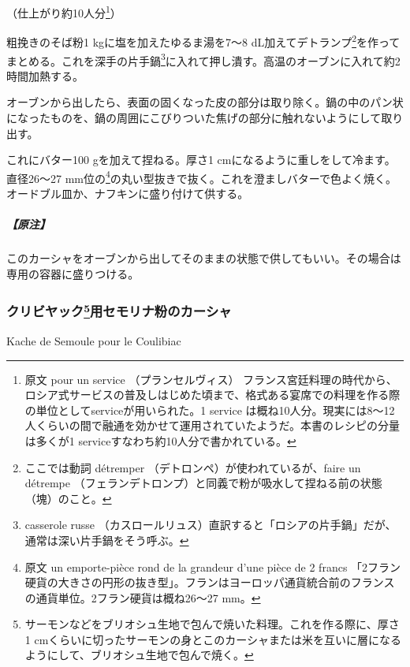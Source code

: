 \begin{recette}
（仕上がり約10人分\footnote{原文 pour un service （プランセルヴィス）
  フランス宮廷料理の時代から、ロシア式サービスの普及しはじめた頃まで、格式ある宴席での料理を作る際の単位としてserviceが用いられた。1
  service
  は概ね10人分。現実には8〜12人くらいの間で融通を効かせて運用されていたようだ。本書のレシピの分量は多くが1
  serviceすなわち約10人分で書かれている。}）

粗挽きのそば粉1 kgに塩を加えたゆるま湯を7〜8
dL加えてデトランプ\footnote{ここでは動詞 détremper
  （デトロンペ）が使われているが、faire un détrempe
  （フェランデトロンプ）と同義で粉が吸水して捏ねる前の状態（塊）のこと。}を作ってまとめる。これを深手の片手鍋\footnote{casserole
  russe
  （カスロールリュス）直訳すると「ロシアの片手鍋」だが、通常は深い片手鍋をそう呼ぶ。}に入れて押し潰す。高温のオーブンに入れて約2時間加熱する。

オーブンから出したら、表面の固くなった皮の部分は取り除く。鍋の中のパン状になったものを、鍋の周囲にこびりついた焦げの部分に触れないようにして取り出す。

これにバター100 gを加えて捏ねる。厚さ1
cmになるように重しをして冷ます。直径26〜27 mm位の\footnote{原文 un
  emporte-pièce rond de la grandeur d'une pièce de 2 francs
  「2フラン硬貨の大きさの円形の抜き型」。フランはヨーロッパ通貨統合前のフランスの通貨単位。2フラン硬貨は概ね26〜27
  mm。}の丸い型抜きで抜く。これを澄ましバターで色よく焼く。オードブル皿か、ナフキンに盛り付けて供する。

\hypertarget{nota-kache-de-sarrazin-pour-potage}{%
\subparagraph{【原注】}\label{nota-kache-de-sarrazin-pour-potage}}

このカーシャをオーブンから出してそのままの状態で供してもいい。その場合は専用の容器に盛りつける。

\atoaki{}

\hypertarget{kache-de-semoule-pour-coulibiac}{%
\subsubsection[クリビヤック用セモリナ粉のカーシャ]{\texorpdfstring{クリビヤック\footnote{サーモンなどをブリオシュ生地で包んで焼いた料理。これを作る際に、厚さ1
  cmくらいに切ったサーモンの身とこのカーシャまたは米を互いに層になるようにして、ブリオシュ生地で包んで焼く。}用セモリナ粉のカーシャ}{クリビヤック用セモリナ粉のカーシャ}}\label{kache-de-semoule-pour-coulibiac}}

\begin{frsubenv}

Kache de Semoule pour le Coulibiac


\end{frsubenv}
\end{recette}
